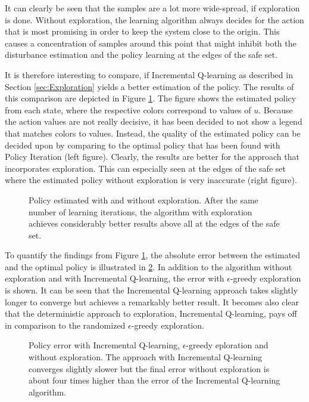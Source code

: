 \documentclass[../main.tex]{subfiles}
\begin{document}
It can clearly be seen that the samples are a lot more wide-spread, if exploration is done. Without exploration, the learning algorithm always decides for the action that is most promising in order to keep the system close to the origin. This causes a concentration of samples around this point that might inhibit both the disturbance estimation and the policy learning at the edges of the safe set. 

It is therefore interesting to compare, if Incremental Q-learning as described in Section \ref{sec:Exploration} yields a better estimation of the policy. The results of this comparison are depicted in Figure \ref{fig:policy_exploration}. The figure shows the estimated policy from each state, where the respective colors correspond to values of $u$. Because the action values are not really decisive, it has been decided to not show a legend that matches colors to values. Instead, the quality of the estimated policy can be decided upon by comparing to the optimal policy that has been found with Policy Iteration (left figure). Clearly, the results are better for the approach that incorporates exploration. This can especially seen at the edges of the safe set where the estimated policy without exploration is very inaccurate (right figure).

\begin{figure}
    \centering
    \caption{Policy estimated with and without exploration. After the same number of learning iterations, the algorithm with exploration achieves considerably better results above all at the edges of the safe set.} \label{fig:policy_exploration}
\end{figure}

To quantify the findings from Figure \ref{fig:policy_exploration}, the absolute error between the estimated and the optimal policy is illustrated in \ref{fig:PolicyError}. In addition to the algorithm without exploration and with Incremental Q-learning, the error with $\epsilon$-greedy exploration is shown. It can be seen that the Incremental Q-learning approach takes slightly longer to converge but achieves a remarkably better result. It becomes also clear that the deterministic approach to exploration, Incremental Q-learning, pays off in comparison to the randomized $\epsilon$-greedy exploration. 

\begin{figure}[h]
    \centering
    \caption{Policy error with Incremental Q-learning, $\epsilon$-greedy eploration and without exploration. The approach with Incremental Q-learning converges slightly slower but the final error without exploration is about four times higher than the error of the Incremental Q-learning algorithm.} \label{fig:PolicyError}
\end{figure}
\end{document}
